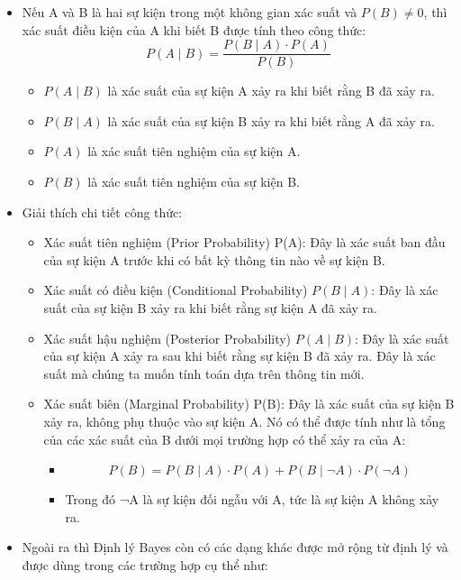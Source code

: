 \begin{itemize}

    \item Nếu A và B là hai sự kiện trong một không gian xác suất và \( P(B) \neq 0 \), thì xác suất điều kiện của A khi biết B được tính theo công thức:
    \[P(A \mid B) = \frac{P(B \mid A) \cdot P(A)}{P(B)}\]
    \begin{itemize}
        \item \( P(A \mid B) \) là xác suất của sự kiện A xảy ra khi biết rằng B đã xảy ra.
        \item \( P(B \mid A) \) là xác suất của sự kiện B xảy ra khi biết rằng A đã xảy ra.
        \item \( P(A) \) là xác suất tiên nghiệm của sự kiện A.
        \item \( P(B) \) là xác suất tiên nghiệm của sự kiện B.
    \end{itemize}
    \item Giải thích chi tiết công thức:
    \begin{itemize}
        \item  Xác suất tiên nghiệm (Prior Probability) P(A): Đây là xác suất ban đầu của sự kiện A trước khi có bất kỳ thông tin nào về sự kiện B.
        \item Xác suất có điều kiện (Conditional Probability) \(P(B \mid A)\): Đây là xác suất của sự kiện B xảy ra khi biết rằng sự kiện A đã xảy ra.
        \item Xác suất hậu nghiệm (Posterior Probability) \(P(A \mid B)\): Đây là xác suất của sự kiện A xảy ra sau khi biết rằng sự kiện B đã xảy ra. Đây là xác suất mà chúng ta muốn tính toán dựa trên thông tin mới.
        \item Xác suất biên (Marginal Probability) P(B): Đây là xác suất của sự kiện B xảy ra, không phụ thuộc vào sự kiện A. Nó có thể được tính như là tổng của các xác suất của B dưới mọi trường hợp có thể xảy ra của A:
        \begin{itemize}
            \item \[P(B) = P(B \mid A) \cdot P(A) + P(B \mid \neg A) \cdot P(\neg A)\]
            \item Trong đó ¬A là sự kiện đối ngẫu với A, tức là sự kiện A không xảy ra.
        \end{itemize}
    \end{itemize}
    \item Ngoài ra thì Định lý Bayes còn có các dạng khác được mở rộng từ định lý và được dùng trong các trường hợp cụ thể như:
    \begin{enumerate}

\end{enumerate}
\end{itemize}
